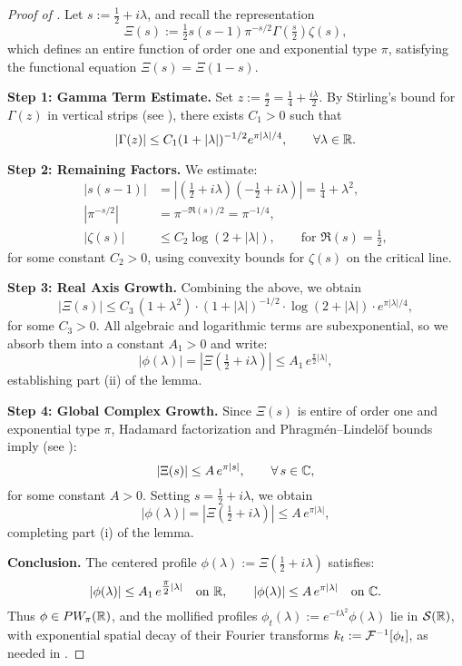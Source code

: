 \begin{proof}[Proof of ]
Let \( s := \tfrac{1}{2} + i\lambda \), and recall the representation
\[
\Xi(s) := \tfrac{1}{2}s(s-1)\pi^{-s/2} \Gamma\left( \tfrac{s}{2} \right) \zeta(s),
\]
which defines an entire function of order one and exponential type \( \pi \), satisfying the functional equation \( \Xi(s) = \Xi(1 - s) \).

\medskip
\noindent\textbf{Step 1: Gamma Term Estimate.}
Set \( z := \tfrac{s}{2} = \tfrac{1}{4} + \tfrac{i\lambda}{2} \). By Stirling’s bound for \( \Gamma(z) \) in vertical strips (see \cite[Eq.~(1.5.3)]{Titchmarsh1986Zeta}), there exists \( C_1 > 0 \) such that
\[
|\Gamma(z)| \le C_1 (1 + |\lambda|)^{-1/2} e^{\pi |\lambda| / 4}, \qquad \forall \lambda \in \mathbb{R}.
\]

\medskip
\noindent\textbf{Step 2: Remaining Factors.}
We estimate:
\begin{align*}
|s(s - 1)| &= \left| \left( \tfrac{1}{2} + i\lambda \right)\left( -\tfrac{1}{2} + i\lambda \right) \right| = \tfrac{1}{4} + \lambda^2, \\
|\pi^{-s/2}| &= \pi^{-\Re(s)/2} = \pi^{-1/4}, \\
|\zeta(s)| &\le C_2 \log(2 + |\lambda|), \qquad \text{for } \Re(s) = \tfrac{1}{2},
\end{align*}
for some constant \( C_2 > 0 \), using convexity bounds for \( \zeta(s) \) on the critical line.

\medskip
\noindent\textbf{Step 3: Real Axis Growth.}
Combining the above, we obtain
\[
|\Xi(s)| \le C_3\, (1 + \lambda^2) \cdot (1 + |\lambda|)^{-1/2} \cdot \log(2 + |\lambda|) \cdot e^{\pi |\lambda| / 4},
\]
for some \( C_3 > 0 \). All algebraic and logarithmic terms are subexponential, so we absorb them into a constant \( A_1 > 0 \) and write:
\[
|\phi(\lambda)| = \left| \Xi\left( \tfrac{1}{2} + i\lambda \right) \right| \le A_1\, e^{\tfrac{\pi}{2} |\lambda|},
\]
establishing part (ii) of the lemma.

\medskip
\noindent\textbf{Step 4: Global Complex Growth.}
Since \( \Xi(s) \) is entire of order one and exponential type \( \pi \), Hadamard factorization and Phragmén--Lindelöf bounds imply (see \cite[Ch.~3]{Levin1996EntireLectures}):
\[
|\Xi(s)| \le A\, e^{\pi |s|}, \qquad \forall\, s \in \mathbb{C},
\]
for some constant \( A > 0 \). Setting \( s = \tfrac{1}{2} + i\lambda \), we obtain
\[
|\phi(\lambda)| = \left| \Xi\left( \tfrac{1}{2} + i\lambda \right) \right| \le A\, e^{\pi |\lambda|},
\]
completing part (i) of the lemma.

\medskip
\noindent\textbf{Conclusion.}
The centered profile \( \phi(\lambda) := \Xi\left(\tfrac{1}{2} + i\lambda\right) \) satisfies:
\[
|\phi(\lambda)| \le A_1\, e^{\tfrac{\pi}{2}|\lambda|} \quad \text{on } \mathbb{R}, \qquad |\phi(\lambda)| \le A\, e^{\pi|\lambda|} \quad \text{on } \mathbb{C}.
\]
Thus \( \phi \in PW_\pi(\mathbb{R}) \), and the mollified profiles \( \phi_t(\lambda) := e^{-t\lambda^2} \phi(\lambda) \) lie in \( \mathcal{S}(\mathbb{R}) \), with exponential spatial decay of their Fourier transforms \( k_t := \mathcal{F}^{-1}[\phi_t] \), as needed in .
\end{proof}
